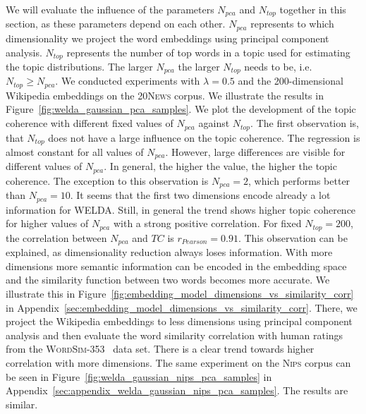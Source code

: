 \documentclass[
        a4paper,
        titlepage,
        twoside,
        parskip
        ]{scrbook}
\theoremstyle{break}
\begin{document}
We will evaluate the influence of the parameters $N_{pca}$ and $N_{top}$ together in this section, as these parameters depend on each other.
$N_{pca}$ represents to which dimensionality we project the word embeddings using principal component analysis.
$N_{top}$ represents the number of top words in a topic used for estimating the topic distributions.
The larger $N_{pca}$ the larger $N_{top}$ needs to be, i.e. $N_{top} \geq N_{pca}$.
We conducted experiments with $\lambda = 0.5$ and the 200-dimensional Wikipedia embeddings on the \textsc{20News} corpus.
We illustrate the results in Figure~\ref{fig:welda_gaussian_pca_samples}.
We plot the development of the topic coherence with different fixed values of $N_{pca}$ against $N_{top}$.
The first observation is, that $N_{top}$ does not have a large influence on the topic coherence.
The regression is almost constant for all values of $N_{pca}$.
However, large differences are visible for different values of $N_{pca}$.
In general, the higher the value, the higher the topic coherence.
The exception to this observation is $N_{pca} = 2$, which performs better than $N_{pca} = 10$.
It seems that the first two dimensions encode already a lot information for WELDA.
Still, in general the trend shows higher topic coherence for higher values of $N_{pca}$ with a strong positive correlation.
For fixed $N_{top} = 200$, the correlation between $N_{pca}$ and $TC$ is $r_{Pearson} = 0.91$.
This observation can be explained, as dimensionality reduction always loses information.
With more dimensions more semantic information can be encoded in the embedding space and the similarity function between two words becomes more accurate.
We illustrate this in Figure~\ref{fig:embedding_model_dimensions_vs_similarity_corr} in Appendix~\ref{sec:embedding_model_dimensions_vs_similarity_corr}.
There, we project the Wikipedia embeddings to less dimensions using principal component analysis and then evaluate the word similarity correlation with human ratings from the \textsc{WordSim-353}~\cite{Agirre2009} data set.
There is a clear trend towards higher correlation with more dimensions.
The same experiment on the \textsc{Nips} corpus can be seen in Figure~\ref{fig:welda_gaussian_nips_pca_samples} in Appendix~\ref{sec:appendix_welda_gaussian_nips_pca_samples}.
The results are similar.
\end{document}
